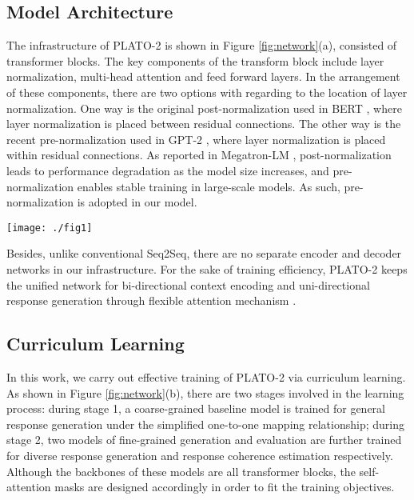 \documentclass[11pt,a4paper]{article}
\begin{document}
	\subsection{Model Architecture}
	The infrastructure of PLATO-2 is shown in Figure \ref{fig:network}(a), consisted of transformer blocks. The key components of the transform block include layer normalization, multi-head attention and feed forward layers. In the arrangement of these components, there are two options with regarding to the location of layer normalization. One way is the original post-normalization used in BERT \cite{devlin2019bert}, where layer normalization is placed between residual connections. The other way is the recent pre-normalization used in GPT-2 \cite{radford2019language}, where layer normalization is placed within residual connections. As reported in Megatron-LM \cite{shoeybi2019megatron}, post-normalization leads to performance degradation as the model size increases, and pre-normalization enables stable training in large-scale models. As such, pre-normalization is adopted in our model.
	\begin{figure*}
		\centering
		\texttt{[image: ./fig1]}
		\caption{PLATO-2 illustration. (a) Network overview with the details of transformer blocks. (b) Curriculum learning process with self-attention visualization and training objectives.}
		\label{fig:network}
	\end{figure*} 
	
	Besides, unlike conventional Seq2Seq, there are no separate encoder and decoder networks in our infrastructure. For the sake of training efficiency, PLATO-2 keeps the unified network for bi-directional context encoding and uni-directional response generation through flexible attention mechanism \cite{dong2019unified, bao2019plato}. 


	\subsection{Curriculum Learning}
	In this work, we carry out effective training of PLATO-2 via curriculum learning. As shown in Figure \ref{fig:network}(b), there are two stages involved in the learning process: during stage 1, a coarse-grained baseline model is trained for general response generation under the simplified one-to-one mapping relationship; during stage 2, two models of fine-grained generation and evaluation are further trained for diverse response generation and response coherence estimation respectively. Although the backbones of these models are all transformer blocks, the self-attention masks are designed accordingly in order to fit the training objectives. 
	
\end{document}
